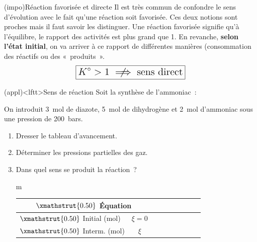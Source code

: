 \documentclass[../../main/main.tex]{subfiles}
\begin{document}
\begin{tcb*}(impo){Réaction favorisée et directe}
	Il est très commun de confondre le sens d'évolution avec le fait qu'une
	réaction soit favorisée. Ces deux notions sont proches mais il faut savoir les
	distinguer.
	\smallbreak
	Une réaction favorisée signifie qu'à l'équilibre, le rapport des activités est
	plus grand que 1. En revanche, \textbf{selon l'état initial}, on va arriver à
	ce rapport de différentes manières (consommation des réactifs ou des
	«~produits~».
	\[
		\Large
		\boxed{K^\circ > 1 \centernot\implies \text{sens direct}}
	\]
\end{tcb*}

\begin{tcb}[width=\linewidth, breakable](appl)<lftt>{Sens de réaction}
	Soit la synthèse de l'ammoniac~:


	On introduit \SI{3}{mol} de diazote, \SI{5}{mol} de dihydrogène et
	\SI{2}{mol} d'ammoniac sous une pression de \SI{200}{bars}.
	\begin{enumerate}
		\item Dresser le tableau d'avancement.
		\item Déterminer les pressions partielles des gaz.
		\item Dans quel sens se produit la réaction~?
	\end{enumerate}
	\tcblower
	\begin{enumerate}
		\item[m]
		      \begin{center}
			      \def\rhgt{0.50}
			      \centering
			      \begin{tabularx}{\linewidth}{|l|c|YdYdYdY|}
				      \hline
				      \multicolumn{2}{|c|}{
					      $\xmathstrut{\rhgt}$
				      \textbf{Équation}}        &
				         & \psw{$+$}    &
				        & \psw{$=$}    &
				       & \psw{\vline} &
				                            \\
				      \hline
				      $\xmathstrut{\rhgt}$
				      Initial (\si{mol})        & $\xi = 0$    &
				                       & \psw{\vline} &
				                       & \psw{\vline} &
				                       & \psw{\vline} &
				                                       \\
				      \hline
				      $\xmathstrut{\rhgt}$
				      Interm.  (\si{mol})       & $\xi$        &
				                 & \psw{\vline} &
				                & \psw{\vline} &
				                & \psw{\vline} &
				                                \\
				      \hline
			      \end{tabularx}
		      \end{center}


\end{enumerate}
\end{tcb}
\end{document}
